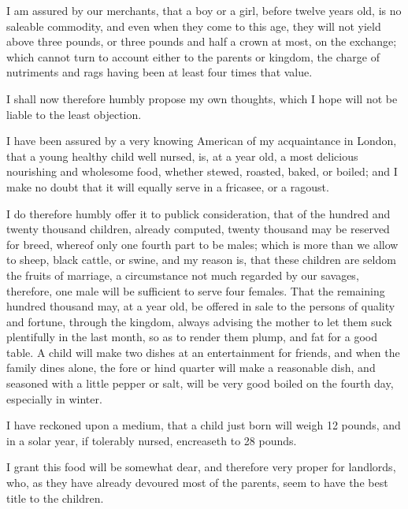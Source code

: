 I am assured by our merchants, that a boy or a girl, before twelve years old, is no saleable commodity, and even when they come to this age, they will not yield above three pounds, or three pounds and half a crown at most, on the exchange; which cannot turn to account either to the parents or kingdom, the charge of nutriments and rags having been at least four times that value.\par

I shall now therefore humbly propose my own thoughts, which I hope will not be liable to the least objection.\par

I have been assured by a very knowing American of my acquaintance in London, that a young healthy child well nursed, is, at a year old, a most delicious nourishing and wholesome food, whether stewed, roasted, baked, or boiled; and I make no doubt that it will equally serve in a fricasee, or a ragoust.\par

I do therefore humbly offer it to publick consideration, that of the hundred and twenty thousand children, already computed, twenty thousand may be reserved for breed, whereof only one fourth part to be males; which is more than we allow to sheep, black cattle, or swine, and my reason is, that these children are seldom the fruits of marriage, a circumstance not much regarded by our savages, therefore, one male will be sufficient to serve four females. That the remaining hundred thousand may, at a year old, be offered in sale to the persons of quality and fortune, through the kingdom, always advising the mother to let them suck plentifully in the last month, so as to render them plump, and fat for a good table. A child will make two dishes at an entertainment for friends, and when the family dines alone, the fore or hind quarter will make a reasonable dish, and seasoned with a little pepper or salt, will be very good boiled on the fourth day, especially in winter.\par

I have reckoned upon a medium, that a child just born will weigh 12 pounds, and in a solar year, if tolerably nursed, encreaseth to 28 pounds.\par

I grant this food will be somewhat dear, and therefore very proper for landlords, who, as they have already devoured most of the parents, seem to have the best title to the children.\par

